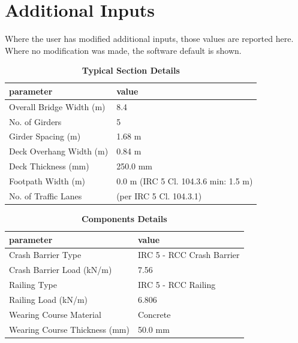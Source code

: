 \documentclass[12pt,a4paper]{report}
\numberwithin{table}{chapter}
\numberwithin{figure}{chapter}
\begin{document}
\newpage
\section{Additional Inputs}
\label{sec:additional-inputs}

Where the user has modified additional inputs, those values are reported here. Where no modification was made, the software default is shown.

\vspace{0.8cm}

\begin{longtable}{|L{5.5cm}|p{10.0cm}|}
\caption{\textbf{Typical Section Details}}
\hline
\textbf{parameter} & \textbf{value} \\
\hline
\textnormal{Overall Bridge Width (m)} & 8.4 \\[6pt]
\hline
\textnormal{No. of Girders} & 5 \\[6pt]
\hline
\textnormal{Girder Spacing (m)} & 1.68 m \\[6pt]
\hline
\textnormal{Deck Overhang Width (m)} & 0.84 m \\[6pt]
\hline
\textnormal{Deck Thickness (mm)} & 250.0 mm \\[6pt]
\hline
\textnormal{Footpath Width (m)} & 0.0 m (IRC 5 Cl. 104.3.6 min: 1.5 m) \\[6pt]
\hline
\textnormal{No. of Traffic Lanes} &  (per IRC 5 Cl. 104.3.1) \\[6pt]
\hline
\end{longtable}

\vspace{0.8em}

\begin{longtable}{|L{5.5cm}|p{10.0cm}|}
\caption{\textbf{Components Details}}
\hline
\textbf{parameter} & \textbf{value} \\
\hline
\textnormal{Crash Barrier Type} & IRC 5 - RCC Crash Barrier \\[6pt]
\hline
\textnormal{Crash Barrier Load (kN/m)} & 7.56 \\[6pt]
\hline

\textnormal{Railing Type} & IRC 5 - RCC Railing \\[6pt]
\hline
\textnormal{Railing Load (kN/m)} & 6.806 \\[6pt]
\hline
\textnormal{Wearing Course Material} & Concrete \\[6pt]
\hline
\textnormal{Wearing Course Thickness (mm)} & 50.0 mm \\[6pt]
\hline
\end{longtable}
\end{document}
